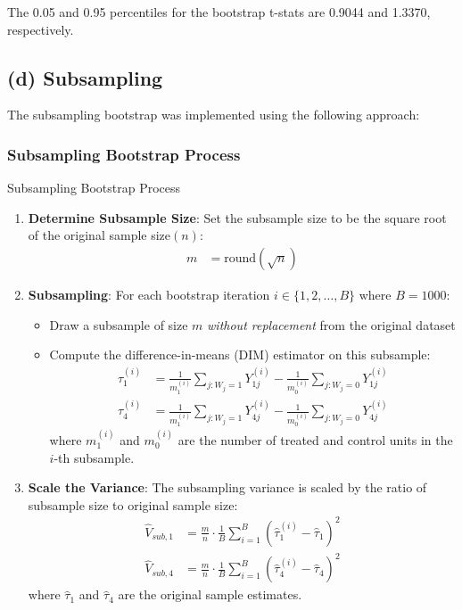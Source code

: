 \documentclass[11pt]{article}
\numberwithin{equation}{section}
\begin{document}
The 0.05 and 0.95 percentiles for the bootstrap t-stats are 0.9044 and 1.3370, respectively.

\subsection{(d) Subsampling}

The subsampling bootstrap was implemented using the following approach:

\subsubsection{Subsampling Bootstrap Process}

\begin{algorithm}
    \caption{Subsampling Bootstrap Process}
    \label{alg:subsampling_bootstrap_process}
    \begin{enumerate}
        \item \textbf{Determine Subsample Size}: Set the subsample size to be the square root of the original sample size$(n)$:
        \begin{align}
            m &= \text{round}(\sqrt{n})
        \end{align}
        
        \item \textbf{Subsampling}: For each bootstrap iteration $i \in \{1, 2, \ldots, B\}$ where $B = 1000$:
        \begin{itemize}
            \item Draw a subsample of size $m$ \textit{without replacement} from the original dataset
            \item Compute the difference-in-means (DIM) estimator on this subsample:
            \begin{align}
                \hat{\tau}^{(i)}_1 &= \frac{1}{m^{(i)}_1} \sum_{j: W_j = 1} Y_{1j}^{(i)} - \frac{1}{m^{(i)}_0} \sum_{j: W_j = 0} Y_{1j}^{(i)} \\
                \hat{\tau}^{(i)}_4 &= \frac{1}{m^{(i)}_1} \sum_{j: W_j = 1} Y_{4j}^{(i)} - \frac{1}{m^{(i)}_0} \sum_{j: W_j = 0} Y_{4j}^{(i)}
            \end{align}
            where $m^{(i)}_1$ and $m^{(i)}_0$ are the number of treated and control units in the $i$-th subsample.
        \end{itemize}
        
        \item \textbf{Scale the Variance}: The subsampling variance is scaled by the ratio of subsample size to original sample size:
        \begin{align}
            \hat{V}_{sub,1} &= \frac{m}{n} \cdot \frac{1}{B} \sum_{i=1}^B \left(\hat{\tau}^{(i)}_1 - \hat{\tau}_1\right)^2 \\
            \hat{V}_{sub,4} &= \frac{m}{n} \cdot \frac{1}{B} \sum_{i=1}^B \left(\hat{\tau}^{(i)}_4 - \hat{\tau}_4\right)^2
        \end{align}
        where $\hat{\tau}_1$ and $\hat{\tau}_4$ are the original sample estimates.
        

\end{enumerate}
\end{algorithm}
\end{document}

